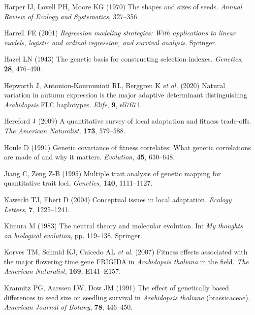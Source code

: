 \documentclass[]{article}
\begin{document}
\leavevmode\hypertarget{ref-Harper1970}{}%
Harper IJ, Lovell PH, Moore KG (1970) The shapes and sizes of seeds. \emph{Annual Review of Ecology and Systematics}, 327--356.

\leavevmode\hypertarget{ref-harrell2001regression}{}%
Harrell FE (2001) \emph{Regression modeling strategies: With applications to linear models, logistic and ordinal regression, and survival analysis}. Springer.

\leavevmode\hypertarget{ref-Hazel1943}{}%
Hazel LN (1943) The genetic basis for constructing selection indexes. \emph{Genetics}, \textbf{28}, 476--490.

\leavevmode\hypertarget{ref-hepworth2020natural}{}%
Hepworth J, Antoniou-Kourounioti RL, Berggren K \emph{et al.} (2020) Natural variation in autumn expression is the major adaptive determinant distinguishing \emph{Arabidopsis} FLC haplotypes. \emph{Elife}, \textbf{9}, e57671.

\leavevmode\hypertarget{ref-Hereford2009}{}%
Hereford J (2009) A quantitative survey of local adaptation and fitness trade-offs. \emph{The American Naturalist}, \textbf{173}, 579--588.

\leavevmode\hypertarget{ref-Houle1991}{}%
Houle D (1991) Genetic covariance of fitness correlates: What genetic correlations are made of and why it matters. \emph{Evolution}, \textbf{45}, 630--648.

\leavevmode\hypertarget{ref-jiang1995multiple}{}%
Jiang C, Zeng Z-B (1995) Multiple trait analysis of genetic mapping for quantitative trait loci. \emph{Genetics}, \textbf{140}, 1111--1127.

\leavevmode\hypertarget{ref-Kawecki2004}{}%
Kawecki TJ, Ebert D (2004) Conceptual issues in local adaptation. \emph{Ecology Letters}, \textbf{7}, 1225--1241.

\leavevmode\hypertarget{ref-kimura2020neutral}{}%
Kimura M (1983) The neutral theory and molecular evolution. In: \emph{My thoughts on biological evolution}, pp. 119--138. Springer.

\leavevmode\hypertarget{ref-korves2007fitness}{}%
Korves TM, Schmid KJ, Caicedo AL \emph{et al.} (2007) Fitness effects associated with the major flowering time gene FRIGIDA in \emph{Arabidopsis thaliana} in the field. \emph{The American Naturalist}, \textbf{169}, E141--E157.

\leavevmode\hypertarget{ref-krannitz1991effect}{}%
Krannitz PG, Aarssen LW, Dow JM (1991) The effect of genetically based differences in seed size on seedling survival in \emph{Arabidopsis thaliana} (brassicaceae). \emph{American Journal of Botany}, \textbf{78}, 446--450.
\end{document}
